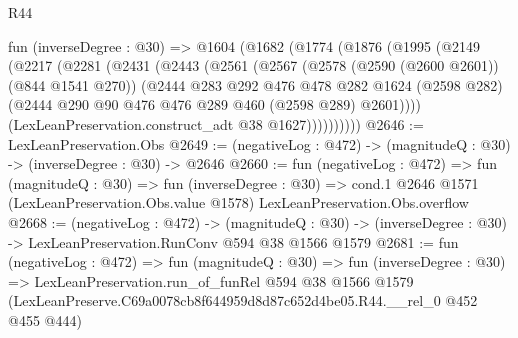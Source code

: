 \begin{lexlean}{R44}
\begin{coremodule}
  fun (inverseDegree : @30) =>
  @1604
    (@1682
      (@1774
        (@1876
          (@1995
            (@2149
              (@2217
                (@2281
                  (@2431
                    (@2443
                      (@2561
                        (@2567
                          (@2578 (@2590 (@2600 @2601)) (@844 @1541 @270))
                          (@2444
                            @283
                            @292
                            @476
                            @478
                            @282
                            @1624
                            (@2598 @282)
                            (@2444 @290 @90 @476 @476 @289 @460 (@2598 @289) @2601))))
                      (LexLeanPreservation.construct_adt @38 @1627))))))))))
@2646 := LexLeanPreservation.Obs
@2649 := (negativeLog : @472) -> (magnitudeQ : @30) -> (inverseDegree : @30) -> @2646
@2660 := fun (negativeLog : @472) =>
  fun (magnitudeQ : @30) =>
  fun (inverseDegree : @30) =>
  cond.{1} @2646 @1571 (LexLeanPreservation.Obs.value @1578) LexLeanPreservation.Obs.overflow
@2668 := (negativeLog : @472) ->
  (magnitudeQ : @30) -> (inverseDegree : @30) -> LexLeanPreservation.RunConv @594 @38 @1566 @1579
@2681 := fun (negativeLog : @472) =>
  fun (magnitudeQ : @30) =>
  fun (inverseDegree : @30) =>
  LexLeanPreservation.run_of_funRel
    @594
    @38
    @1566
    @1579
    (LexLeanPreserve.C69a0078cb8f644959d8d87c652d4be05.R44.__rel_0 @452 @455 @444)
\end{coremodule}
\end{lexlean}
